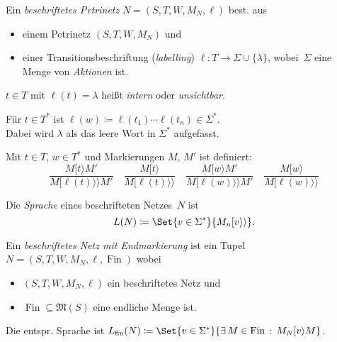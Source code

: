 \documentclass{cheat-sheet}
\newcommand{\activeTransition}[1]{[{#1}\rangle} %
\newcommand{\labelledTransition}[1]{[{#1}\rangle\rangle} %
\newcommand{\inferrule}[2]{\frac{{#1}}{{#2}}} %
\newcommand{\Markings}{\mathfrak{M}} %
\DeclareMathOperator{\Fin}{Fin} %
\newcommand{\fin}{\mathrm{fin}} %
\begin{document}
\begin{defn}
  Ein \emph{beschriftetes Petrinetz} $N = (S, T, W, M_N, \ell)$ best. aus
  \begin{itemize}
    \item einem Petrinetz $(S, T, W, M_N)$ und
    \item einer Transitionsbeschriftung (\textit{labelling}) $\ell : T \to \Sigma \cup \{ \lambda \}$, wobei~$\Sigma$ eine Menge von \textit{Aktionen} ist.
  \end{itemize}
\end{defn}

\begin{sprechweise}
  $t \in T$ mit $\ell(t) = \lambda$ heißt \textit{intern} oder \textit{unsichtbar}.
\end{sprechweise}

\begin{nota}
  \begin{minipage}[t]{0.8 \linewidth}
    Für $t \in T^{*}$ ist $\ell(w) \coloneqq \ell(t_1) \cdots \ell(t_n) \in \Sigma^{*}$. \\
    Dabei wird $\lambda$ als das leere Wort in $\Sigma^{*}$ aufgefasst.
  \end{minipage}
\end{nota}

\begin{defn}
  Mit $t \in T$, $w \in T^{*}$ und Markierungen $M$, $M'$ ist definiert:
  \[
    \inferrule
      {M \activeTransition{t} M'}
      {M \labelledTransition{\ell(t)} M'} \quad
    \inferrule
      {M \activeTransition{t}}
      {M \labelledTransition{\ell(t)}} \quad
    \inferrule
      {M \activeTransition{w} M'}
      {M \labelledTransition{\ell(w)} M'} \quad
    \inferrule
      {M \activeTransition{w}}
      {M \labelledTransition{\ell(w)}}
  \]
\end{defn}

\begin{defn}
  Die \emph{Sprache} eines beschrifteten Netzes~$N$ ist
  \[
    L(N) \coloneqq \Set{v \in \Sigma^{*}}{M_n \labelledTransition{v}}.
  \]
\end{defn}

\begin{defn}
  Ein \emph{beschriftetes Netz mit Endmarkierung} ist ein Tupel $N = (S, T, W, M_N, \ell, \Fin)$ wobei
  \begin{itemize}
    \item $(S, T, W, M_N, \ell)$ ein beschriftetes Netz und
    \item $\Fin \subseteq \Markings(S)$ eine endliche Menge ist.
  \end{itemize}
  Die entspr. Sprache ist $L_\fin(N) \coloneqq \Set{v \in \Sigma^{*}}{\ex{M \in \Fin} M_N \activeTransition{v} M}$.
\end{defn}
\end{document}
